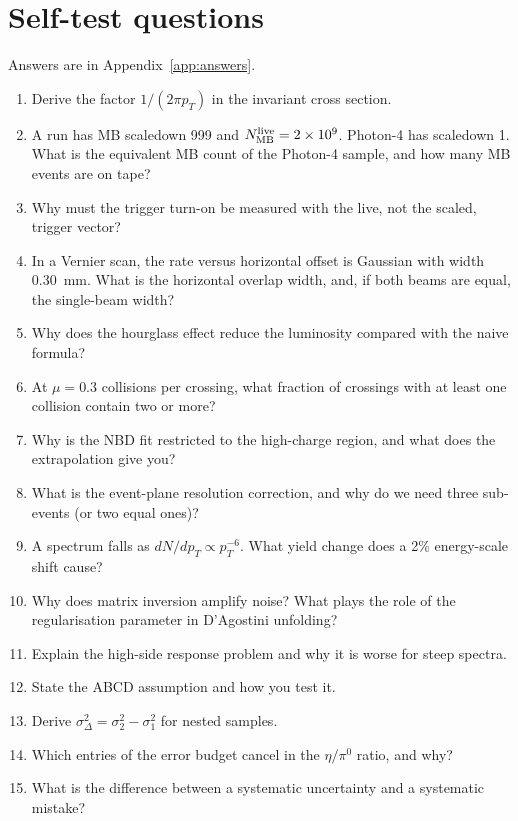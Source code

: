 \documentclass[11pt,letterpaper]{article}
\begin{document}
\section{Self-test questions}
Answers are in Appendix~\ref{app:answers}.
\begin{enumerate}
\item Derive the factor $1/(2\pi p_T)$ in the invariant cross section.
\item A run has MB scaledown 999 and $N^{\rm live}_{\rm MB}=2\times10^{9}$. Photon-4 has scaledown 1. What is the equivalent MB count of
the Photon-4 sample, and how many MB events are on tape?
\item Why must the trigger turn-on be measured with the live, not the scaled, trigger vector?
\item In a Vernier scan, the rate versus horizontal offset is Gaussian with width 0.30~mm. What is the horizontal overlap width, and,
if both beams are equal, the single-beam width?
\item Why does the hourglass effect reduce the luminosity compared with the naive formula?
\item At $\mu=0.3$ collisions per crossing, what fraction of crossings with at least one collision contain two or more?
\item Why is the NBD fit restricted to the high-charge region, and what does the extrapolation give you?
\item What is the event-plane resolution correction, and why do we need three sub-events (or two equal ones)?
\item A spectrum falls as $dN/dp_T\propto p_T^{-6}$. What yield change does a 2\% energy-scale shift cause?
\item Why does matrix inversion amplify noise? What plays the role of the regularisation parameter in D'Agostini unfolding?
\item Explain the high-side response problem and why it is worse for steep spectra.
\item State the ABCD assumption and how you test it.
\item Derive $\sigma_\Delta^2=\sigma_2^2-\sigma_1^2$ for nested samples.
\item Which entries of the error budget cancel in the $\eta/\pi^0$ ratio, and why?
\item What is the difference between a systematic uncertainty and a systematic mistake?
\end{enumerate}

\end{document}
